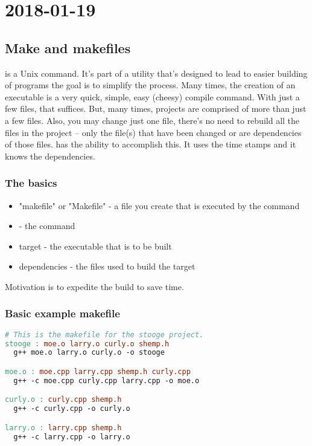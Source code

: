 \section{2018-01-19}


\subsection{Make and makefiles}

 is a Unix command. It's part of a utility that's designed to lead to easier building of programs the goal is to simplify the process. Many times, the creation of an executable is a very quick, simple, easy (cheesy) compile command. With just a few files, that suffices. But, many times, projects are comprised  of more than just a few files. Also, you may change just one file, there's no need to rebuild all the files in the project -- only the file(s) that have been changed or are dependencies of those files.  has the ability to accomplish this. It uses the time stamps and it knows the dependencies.

\subsubsection{The basics}

\begin{itemize}
  \item "makefile" or "Makefile" - a file you create that is executed by the command 
  \item {} - the command
  \item target - the executable that is to be built
  \item dependencies - the files used to build the target
\end{itemize}

Motivation is to expedite the build to save time.

\subsubsection{Basic example makefile}

\begin{lstlisting}[language=make]
# This is the makefile for the stooge project.
stooge : moe.o larry.o curly.o shemp.h 
  g++ moe.o larry.o curly.o -o stooge

moe.o : moe.cpp larry.cpp shemp.h curly.cpp 
  g++ -c moe.cpp curly.cpp larry.cpp -o moe.o 

curly.o : curly.cpp shemp.h
  g++ -c curly.cpp -o curly.o

larry.o : larry.cpp shemp.h
  g++ -c larry.cpp -o larry.o
\end{lstlisting}

